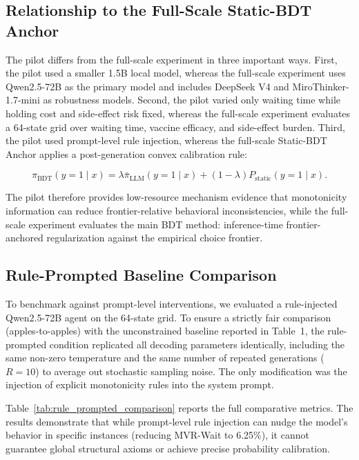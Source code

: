 \documentclass[11pt]{article}
\begin{document}
\subsection{Relationship to the Full-Scale Static-BDT Anchor}

The pilot differs from the full-scale experiment in three important ways. First, the pilot used a smaller 1.5B local model, whereas the full-scale experiment uses Qwen2.5-72B as the primary model and includes DeepSeek V4 and MiroThinker-1.7-mini as robustness models. Second, the pilot varied only waiting time while holding cost and side-effect risk fixed, whereas the full-scale experiment evaluates a 64-state grid over waiting time, vaccine efficacy, and side-effect burden. Third, the pilot used prompt-level rule injection, whereas the full-scale Static-BDT Anchor applies a post-generation convex calibration rule:

\[
\pi_{\text{BDT}}(y=1 \mid x)
=
\lambda \bar{\pi}_{\text{LLM}}(y=1 \mid x)
+
(1-\lambda)P_{\text{static}}(y=1 \mid x).
\]

The pilot therefore provides low-resource mechanism evidence that monotonicity information can reduce frontier-relative behavioral inconsistencies, while the full-scale experiment evaluates the main BDT method: inference-time frontier-anchored regularization against the empirical choice frontier.


\subsection{Rule-Prompted Baseline Comparison}
\label{app:rule_prompted_baseline}

To benchmark against prompt-level interventions, we evaluated a rule-injected Qwen2.5-72B agent on the 64-state grid. To ensure a strictly fair comparison (apples-to-apples) with the unconstrained baseline reported in Table~1, the rule-prompted condition replicated all decoding parameters identically, including the same non-zero temperature and the same number of repeated generations ($R=10$) to average out stochastic sampling noise. The only modification was the injection of explicit monotonicity rules into the system prompt.

Table~\ref{tab:rule_prompted_comparison} reports the full comparative metrics. The results demonstrate that while prompt-level rule injection can nudge the model's behavior in specific instances (reducing MVR-Wait to 6.25\%), it cannot guarantee global structural axioms or achieve precise probability calibration.
\end{document}
